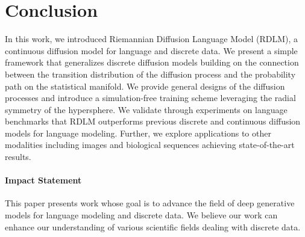 \section{Conclusion}
In this work, we introduced Riemannian Diffusion Language Model (RDLM), a continuous diffusion model for language and discrete data.
We present a simple framework that generalizes discrete diffusion models building on the connection between the transition distribution of the diffusion process and the probability path on the statistical manifold.
We provide general designs of the diffusion processes and introduce a simulation-free training scheme leveraging the radial symmetry of the hypersphere. 
We validate through experiments on language benchmarks that RDLM outperforms previous discrete and continuous diffusion models 
for language modeling. 
Further, we explore applications to other modalities including images and biological sequences achieving state-of-the-art results.

\paragraph{Impact Statement}
This paper presents work whose goal is to advance the field of deep generative models for language modeling and discrete data. We believe our work can enhance our understanding of various scientific fields dealing with discrete data.